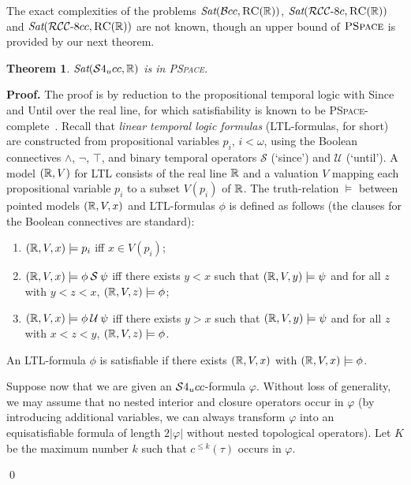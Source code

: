 \documentclass{LMCS}
\renewenvironment{proof}{\par\noindent\textbf{Proof.}}{\mbox{}\qed\par\medskip}
\theoremstyle{plain}
\newtheorem{theorem}[thm]{Theorem}
\newcommand{\Sat}{\textit{Sat}}
\newcommand{\PSpace}{\textsc{PSpace}}
\newcommand{\since}{\mathbin{\mathcal{S}}}
\newcommand{\until}{\mathbin{\mathcal{U}}}
\begin{document}
The exact complexities of the problems $\Sat(\cBcc,\RegC(\R))$,
$\Sat(\RCCEc,\RegC(\R))$ and \linebreak
$\Sat(\RCCEcc,\RegC(\R))$ are not known, though an upper
bound of $\PSpace$ is provided by our next theorem.
\begin{theorem}\label{thm:R:PSpace}
$\Sat(\conTc,\R)$ is in \PSpace{}.
\end{theorem}
\begin{proof}
The proof is by reduction to the propositional temporal logic with Since and Until over the
real line, for which satisfiability is known to be
\PSpace{}-complete~\cite{Reynolds-real}. Recall that \emph{linear temporal
logic formulas} (LTL-formulas, for short) are constructed from
propositional variables $p_i$, $i<\omega$, using the Boolean
connectives $\wedge$, $\neg$, $\top$, and binary temporal operators
$\since$ (`since') and $\until$ (`until'). A model $(\mathbb{R},V)$ for LTL
consists of the real line $\mathbb{R}$ and a valuation $V$ mapping each
propositional variable $p_i$ to a subset $V(p_i)$ of $\mathbb{R}$. The
truth-relation $\models$ between pointed models $(\mathbb{R},V,x)$ and
LTL-formulas $\phi$ is defined as follows (the clauses for the
Boolean connectives are standard):
\begin{enumerate}[$\bullet$]
\item $(\mathbb{R},V,x) \models p_i$ iff $x\in V(p_{i})$;
\item $(\R,V,x) \models \phi \since \psi$ iff there exists $y<x$ such that $(\mathbb{R},V,y) \models \psi$
and for all $z$ with $y<z< x$, $(\mathbb{R},V,z) \models \phi$;
\item $(\R,V,x) \models \phi \until \psi$ iff there exists $y>x$ such that $(\mathbb{R},V,y) \models \psi$
and for all $z$ with $x< z < y$, $(\mathbb{R},V,z)
\models \phi$.
\end{enumerate}
An LTL-formula $\phi$ is satisfiable if there exists $(\mathbb{R},V,x)$
with $(\mathbb{R},V,x)\models \phi$.

Suppose
now that we are given an $\mathcal{S}4_u{}cc$-formula $\varphi$. Without loss of generality, we may assume that
no nested interior and closure operators occur in $\varphi$ (by introducing additional variables, we can always transform $\varphi$ into an equisatisfiable formula of length $2|\varphi|$ without nested topological operators).
Let $K$ be the maximum number $k$ such that $c^{\leq k}(\tau)$ occurs in $\varphi$.


\end{proof}
\end{document}
